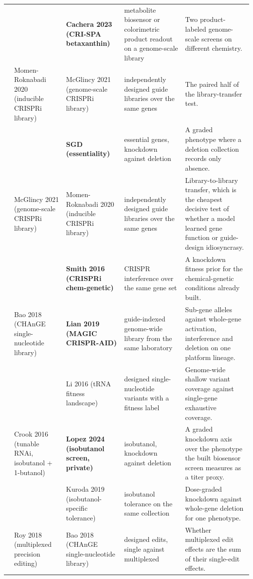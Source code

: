 \begin{landscape}
\begin{longtable}{@{}r@{\hspace{4pt}} L{42mm} L{44mm} L{48mm} L{96mm}@{}}
 &  & \textbf{Cachera 2023 (CRI-SPA betaxanthin)} & metabolite biosensor or colorimetric product readout on a genome-scale library & Two product-labeled genome-scale screens on different chemistry. \\
 & Momen-Roknabadi 2020 (inducible CRISPRi library) & McGlincy 2021 (genome-scale CRISPRi library) & independently designed guide libraries over the same genes & The paired half of the library-transfer test. \\
 &  & \textbf{SGD (essentiality)} & essential genes, knockdown against deletion & A graded phenotype where a deletion collection records only absence. \\
 & McGlincy 2021 (genome-scale CRISPRi library) & Momen-Roknabadi 2020 (inducible CRISPRi library) & independently designed guide libraries over the same genes & Library-to-library transfer, which is the cheapest decisive test of whether a model learned gene function or guide-design idiosyncrasy. \\
 &  & \textbf{Smith 2016 (CRISPRi chem-genetic)} & CRISPR interference over the same gene set & A knockdown fitness prior for the chemical-genetic conditions already built. \\
 & Bao 2018 (CHAnGE single-nucleotide library) & \textbf{Lian 2019 (MAGIC CRISPR-AID)} & guide-indexed genome-wide library from the same laboratory & Sub-gene alleles against whole-gene activation, interference and deletion on one platform lineage. \\
 &  & Li 2016 (tRNA fitness landscape) & designed single-nucleotide variants with a fitness label & Genome-wide shallow variant coverage against single-gene exhaustive coverage. \\
 & Crook 2016 (tunable RNAi, isobutanol + 1-butanol) & \textbf{Lopez 2024 (isobutanol screen, private)} & isobutanol, knockdown against deletion & A graded knockdown axis over the phenotype the built biosensor screen measures as a titer proxy. \\
 &  & Kuroda 2019 (isobutanol-specific tolerance) & isobutanol tolerance on the same collection & Dose-graded knockdown against whole-gene deletion for one phenotype. \\
 & Roy 2018 (multiplexed precision editing) & Bao 2018 (CHAnGE single-nucleotide library) & designed edits, single against multiplexed & Whether multiplexed edit effects are the sum of their single-edit effects. \\

\end{longtable}
\end{landscape}
